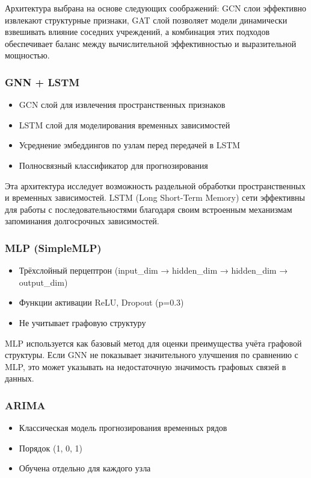 \documentclass[12pt,a4paper]{article}
\begin{document}
	Архитектура выбрана на основе следующих соображений: GCN слои эффективно извлекают структурные признаки, GAT слой позволяет модели динамически взвешивать влияние соседних учреждений, а комбинация этих подходов обеспечивает баланс между вычислительной эффективностью и выразительной мощностью.
	
	\subsubsection*{GNN + LSTM}
	\begin{itemize}
		\item GCN слой для извлечения пространственных признаков
		\item LSTM слой для моделирования временных зависимостей
		\item Усреднение эмбеддингов по узлам перед передачей в LSTM
		\item Полносвязный классификатор для прогнозирования
	\end{itemize}
	
	Эта архитектура исследует возможность раздельной обработки пространственных и временных зависимостей. LSTM (Long Short-Term Memory) сети эффективны для работы с последовательностями благодаря своим встроенным механизмам запоминания долгосрочных зависимостей.
	
	\subsubsection*{MLP (SimpleMLP)}
	\begin{itemize}
		\item Трёхслойный перцептрон (input\_dim → hidden\_dim → hidden\_dim → output\_dim)
		\item Функции активации ReLU, Dropout (p=0.3)
		\item Не учитывает графовую структуру
	\end{itemize}
	
	MLP используется как базовый метод для оценки преимущества учёта графовой структуры. Если GNN не показывает значительного улучшения по сравнению с MLP, это может указывать на недостаточную значимость графовых связей в данных.
	
	\subsubsection*{ARIMA}
	\begin{itemize}
		\item Классическая модель прогнозирования временных рядов
		\item Порядок (1, 0, 1)
		\item Обучена отдельно для каждого узла
	\end{itemize}
	
\end{document}
